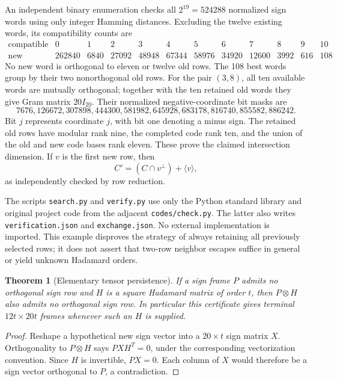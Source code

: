 \documentclass[11pt]{article}
\newtheorem{theorem}{Theorem}
\begin{document}
An independent binary enumeration checks all $2^{19}=524288$
normalized sign words using only integer Hamming distances. Excluding
the twelve existing words, its compatibility counts are
\[
\begin{array}{c|rrrrrrrrrrr}
\text{compatible}&0&1&2&3&4&5&6&7&8&9&10\\\hline
\text{new classes}&262840&6840&27092&48948&67344&58976&34920&12600&3992&616&108
\end{array}
\]
No new word is orthogonal to eleven or twelve old rows. The 108
best words group by their two nonorthogonal old rows. For the pair
$(3,8)$, all ten available words are mutually orthogonal; together
with the ten retained old words they give Gram matrix $20I_{20}$.
Their normalized negative-coordinate bit masks are
\[
7676,126672,307898,444300,581982,645928,683178,816740,855582,886242.
\]
Bit $j$ represents coordinate $j$, with bit one denoting a minus sign.
The retained old rows have modular rank nine, the completed code
rank ten, and the union of the old and new code bases rank eleven.
These prove the claimed intersection dimension. If $v$ is the first
new row, then
\[
 C'=(C\cap v^\perp)+\langle v\rangle,
\]
as independently checked by row reduction.

The scripts \texttt{search.py} and \texttt{verify.py} use only the
Python standard library and original project code from the adjacent
\texttt{codes/check.py}. The latter also writes
\texttt{verification.json} and \texttt{exchange.json}. No external
implementation is imported. This example disproves the strategy of
always retaining all previously selected rows; it does not assert
that two-row neighbor escapes suffice in general or yield unknown
Hadamard orders.

\begin{theorem}[Elementary tensor persistence]
If a sign frame $P$ admits no orthogonal sign row and $H$ is a square
Hadamard matrix of order $t$, then $P\otimes H$ also admits no
orthogonal sign row. In particular this certificate gives terminal
$12t\times20t$ frames whenever such an $H$ is supplied.
\end{theorem}
\begin{proof}
Reshape a hypothetical new sign vector into a $20\times t$ sign
matrix $X$. Orthogonality to $P\otimes H$ says $PXH^T=0$, under
the corresponding vectorization convention. Since $H$ is invertible,
$PX=0$. Each column of $X$ would therefore be a sign vector
orthogonal to $P$, a contradiction.
\end{proof}
\end{document}
